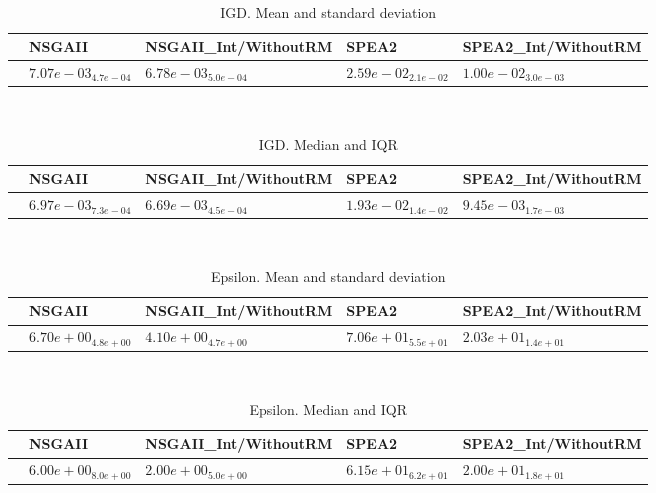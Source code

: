 \documentclass{article}
\begin{document}
\
\begin{table}
\caption{IGD. Mean and standard deviation}
\label{table:mean.IGD}
\centering
\begin{scriptsize}
\begin{tabular}{lllll}
\hline & NSGAII & NSGAII\_Int/WithoutRM & SPEA2 &  SPEA2\_Int/WithoutRM\\
\hline
 & \cellcolor{gray25}$  7.07e-03_{ 4.7e-04}$ & \cellcolor{gray95}$  6.78e-03_{ 5.0e-04}$ & $  2.59e-02_{ 2.1e-02}$ & $  1.00e-02_{ 3.0e-03}$ \\
\hline
\end{tabular}
\end{scriptsize}
\end{table}
\
\begin{table}
\caption{IGD. Median and IQR}
\label{table:median.IGD}
\begin{scriptsize}
\centering
\begin{tabular}{lllll}
\hline & NSGAII & NSGAII\_Int/WithoutRM & SPEA2 &  SPEA2\_Int/WithoutRM\\
\hline
 & \cellcolor{gray25}$  6.97e-03_{ 7.3e-04}$ & \cellcolor{gray95}$  6.69e-03_{ 4.5e-04}$ & $  1.93e-02_{ 1.4e-02}$ & $  9.45e-03_{ 1.7e-03}$ \\
\hline
\end{tabular}
\end{scriptsize}
\end{table}
\
\begin{table}
\caption{Epsilon. Mean and standard deviation}
\label{table:mean.Epsilon}
\centering
\begin{scriptsize}
\begin{tabular}{lllll}
\hline & NSGAII & NSGAII\_Int/WithoutRM & SPEA2 &  SPEA2\_Int/WithoutRM\\
\hline
 & \cellcolor{gray25}$  6.70e+00_{ 4.8e+00}$ & \cellcolor{gray95}$  4.10e+00_{ 4.7e+00}$ & $  7.06e+01_{ 5.5e+01}$ & $  2.03e+01_{ 1.4e+01}$ \\
\hline
\end{tabular}
\end{scriptsize}
\end{table}
\
\begin{table}
\caption{Epsilon. Median and IQR}
\label{table:median.Epsilon}
\begin{scriptsize}
\centering
\begin{tabular}{lllll}
\hline & NSGAII & NSGAII\_Int/WithoutRM & SPEA2 &  SPEA2\_Int/WithoutRM\\
\hline
 & \cellcolor{gray25}$  6.00e+00_{ 8.0e+00}$ & \cellcolor{gray95}$  2.00e+00_{ 5.0e+00}$ & $  6.15e+01_{ 6.2e+01}$ & $  2.00e+01_{ 1.8e+01}$ \\
\hline
\end{tabular}
\end{scriptsize}
\end{table}
\end{document}
